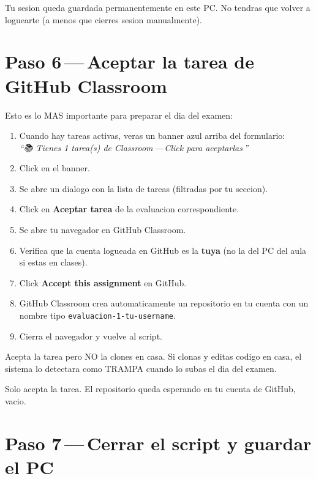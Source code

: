\documentclass[11pt,a4paper,oneside]{report}
\begin{document}
\begin{successbox}
Tu sesion queda guardada permanentemente en este PC. No tendras que volver a loguearte (a menos que cierres sesion manualmente).
\end{successbox}

\section{Paso 6\,---\,Aceptar la tarea de GitHub Classroom}

Esto es lo MAS importante para preparar el dia del examen:

\begin{enumerate}
  \item Cuando hay tareas activas, veras un banner azul arriba del formulario:\\
        \emph{\textquotedblleft 📚 Tienes 1 tarea(s) de Classroom\,---\,Click para aceptarlas\,\textquotedblright}
  \item Click en el banner.
  \item Se abre un dialogo con la lista de tareas (filtradas por tu seccion).
  \item Click en \textbf{Aceptar tarea} de la evaluacion correspondiente.
  \item Se abre tu navegador en GitHub Classroom.
  \item Verifica que la cuenta logueada en GitHub es la \textbf{tuya} (no la del PC del aula si estas en clases).
  \item Click \textbf{Accept this assignment} en GitHub.
  \item GitHub Classroom crea automaticamente un repositorio en tu cuenta con un nombre tipo \texttt{evaluacion-1-tu-username}.
  \item Cierra el navegador y vuelve al script.
\end{enumerate}

\begin{warnbox}
Acepta la tarea pero NO la clones en casa. Si clonas y editas codigo en casa, el sistema lo detectara como TRAMPA cuando lo subas el dia del examen.

Solo acepta la tarea. El repositorio queda esperando en tu cuenta de GitHub, vacio.
\end{warnbox}

\section{Paso 7\,---\,Cerrar el script y guardar el PC}
\end{document}
